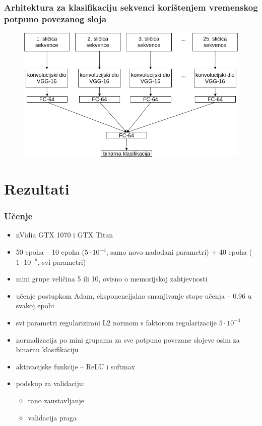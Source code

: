 \documentclass{beamer}
\begin{document}
\begin{frame}
\frametitle{Arhitektura za klasifikaciju sekvenci korištenjem vremenskog potpuno povezanog sloja}

 \begin{figure}[H]
\centering
\includegraphics[scale=0.35]{images/sequence_temporal.png}
\end{figure} 

\end{frame}

\section{Rezultati}

\begin{frame}
 \frametitle{Učenje}
 \begin{itemize}
 \item nVidia GTX 1070 i GTX Titan
  \item 50 epoha -- 10 epoha ($5\cdot10^{-4}$, samo novo nadodani parametri) + 40 epoha ($1\cdot10^{-5}$, svi parametri)
  \item mini grupe veličina 5 ili 10, ovisno o memorijskoj zahtjevnosti
  \item učenje postupkom Adam, eksponencijalno smanjivanje stope učenja -- 0.96 u svakoj epohi
  \item svi parametri regularizirani L2 normom s faktorom regularizacije $5\cdot10^{-4}$
  \item normalizacija po mini grupama za sve potpuno povezane slojeve osim za binarnu klasifikaciju
  \item aktivacijske funkcije -- ReLU i softmax
  \item podskup za validaciju:
  \begin{itemize}
   \item rano zaustavljanje
   \item validacija praga
  \end{itemize}

 \end{itemize}

\end{frame}
\end{document}
